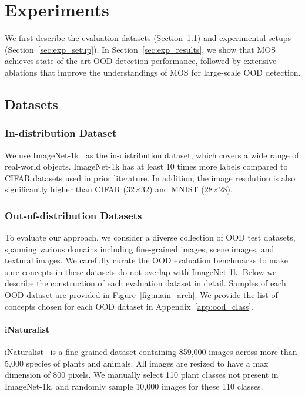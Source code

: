\documentclass[final]{cvpr}
\begin{document}
\section{Experiments}
\vspace{-0.1cm}
We first describe the evaluation datasets (Section~\ref{sec:dataset}) and  experimental setups (Section~\ref{sec:exp_setup}). In Section~\ref{sec:exp_results}, we show that MOS achieves state-of-the-art OOD detection performance, followed by extensive ablations that improve the understandings of MOS for large-scale OOD detection.

\subsection{Datasets}
\label{sec:dataset}

\subsubsection{In-distribution Dataset}
\vspace{-0.2cm}
We use ImageNet-1k~\cite{deng2009imagenet} as the in-distribution dataset, which covers a wide range of real-world objects. ImageNet-1k has at least 10 times more labels compared to CIFAR datasets used in prior literature. In addition, the image resolution is also significantly higher than CIFAR (32$\times$32) and MNIST (28$\times$28). 


\vspace{-0.4cm}
\subsubsection{Out-of-distribution Datasets}
\vspace{-0.2cm}
To evaluate our approach, we consider a diverse collection of OOD test datasets, spanning various domains including fine-grained images, scene images, and textural images. We carefully curate the OOD evaluation benchmarks to make sure concepts in these datasets do not overlap with ImageNet-1k. Below we describe the construction of each evaluation dataset in detail. Samples of each OOD dataset are provided in Figure~\ref{fig:main_arch}. We provide the list of concepts chosen for each OOD dataset in Appendix~\ref{app:ood_class}.


\vspace{-0.4cm}
\paragraph{iNaturalist} iNaturalist~\cite{van2018inaturalist} is a fine-grained dataset containing 859,000 images across more than 5,000 species of plants and animals. All images are resized to have a max dimension of 800 pixels. We manually select 110 plant classes not present in ImageNet-1k, and randomly sample 10,000 images for these 110 classes. \vspace{-0.4cm}
\end{document}
